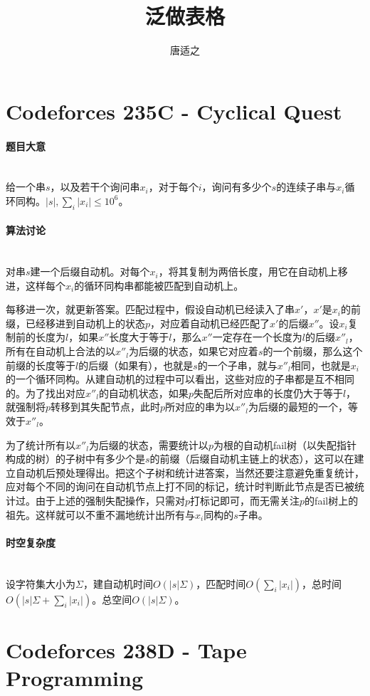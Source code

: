 \documentclass[UTF8]{ctexart}
\title{泛做表格}
\author{唐适之}
\date{}
\newcommand{\myparagraph}[1]{\paragraph{#1}\mbox{}\\}
\theoremstyle{nonumberplain}
\begin{document}
	
	\maketitle
	
	\tableofcontents
	\vfill
	\newpage
	
	\section{Codeforces 235C - Cyclical Quest}
	
		\myparagraph{题目大意}
		
			给一个串$s$，以及若干个询问串$x_i$，对于每个$i$，询问有多少个$s$的连续子串与$x_i$循环同构。$|s|,\sum_i|x_i| \leq 10^6$。
			
		\myparagraph{算法讨论}
		
			对串$s$建一个后缀自动机。对每个$x_i$，将其复制为两倍长度，用它在自动机上移进，这样每个$x_i$的循环同构串都能被匹配到自动机上。
			
			每移进一次，就更新答案。匹配过程中，假设自动机已经读入了串$x'$，$x'$是$x_i$的前缀，已经移进到自动机上的状态$p$，对应着自动机已经匹配了$x'$的后缀$x''$。设$x_i$复制前的长度为$l$，如果$x''$长度大于等于$l$，那么$x''$一定存在一个长度为$l$的后缀$x''_l$，所有在自动机上合法的以$x''_l$为后缀的状态，如果它对应着$s$的一个前缀，那么这个前缀的长度等于$l$的后缀（如果有），也就是$s$的一个子串，就与$x''_l$相同，也就是$x_i$的一个循环同构。从建自动机的过程中可以看出，这些对应的子串都是互不相同的。为了找出对应$x''_l$的自动机状态，如果$p$失配后所对应串的长度仍大于等于$l$，就强制将$p$转移到其失配节点，此时$p$所对应的串为以$x''_l$为后缀的最短的一个，等效于$x''_l$。
			
			为了统计所有以$x''_l$为后缀的状态，需要统计以$p$为根的自动机fail树（以失配指针构成的树）的子树中有多少个是$s$的前缀（后缀自动机主链上的状态），这可以在建立自动机后预处理得出。把这个子树和统计进答案，当然还要注意避免重复统计，应对每个不同的询问在自动机节点上打不同的标记，统计时判断此节点是否已被统计过。由于上述的强制失配操作，只需对$p$打标记即可，而无需关注$p$的fail树上的祖先。这样就可以不重不漏地统计出所有与$x_i$同构的$s$子串。
			
		\myparagraph{时空复杂度}
		
			设字符集大小为$\Sigma$，建自动机时间$O(|s|\Sigma)$，匹配时间$O(\sum_i|x_i|)$，总时间$O(|s|\Sigma+\sum_i|x_i|)$。总空间$O(|s|\Sigma)$。
	
	\section{Codeforces 238D - Tape Programming}
	
\end{document}
